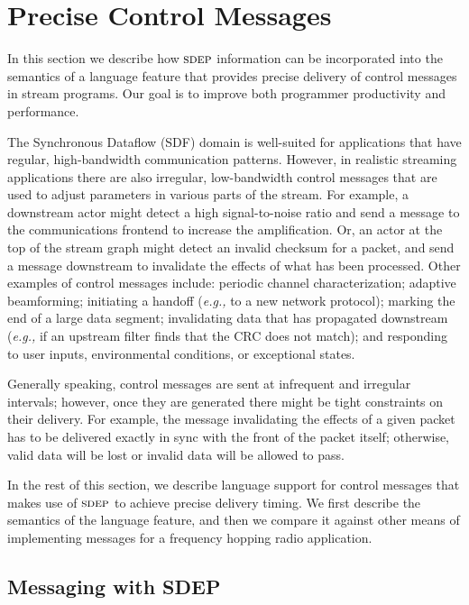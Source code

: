 \section{Precise Control Messages}
In this section we describe how $\textsc{sdep}$ information can be
incorporated into the semantics of a language feature that provides
precise delivery of control messages in stream programs.  Our goal is
to improve both programmer productivity and performance.

The Synchronous Dataflow (SDF) domain is well-suited for applications
that have regular, high-bandwidth communication patterns.  However, in
realistic streaming applications there are also irregular,
low-bandwidth control messages that are used to adjust parameters in
various parts of the stream.  For example, a downstream actor might
detect a high signal-to-noise ratio and send a message to the
communications frontend to increase the amplification.  Or, an actor
at the top of the stream graph might detect an invalid checksum for a
packet, and send a message downstream to invalidate the effects of
what has been processed.  Other examples of control messages include:
periodic channel characterization; adaptive beamforming; initiating a
handoff ({\it e.g.,} to a new network protocol); marking the end of a
large data segment; invalidating data that has propagated downstream
({\it e.g.,} if an upstream filter finds that the CRC does not match);
and responding to user inputs, environmental conditions, or
exceptional states.

Generally speaking, control messages are sent at infrequent and
irregular intervals; however, once they are generated there might be
tight constraints on their delivery.  For example, the message
invalidating the effects of a given packet has to be delivered exactly
in sync with the front of the packet itself; otherwise, valid data
will be lost or invalid data will be allowed to pass.

In the rest of this section, we describe language support for control
messages that makes use of $\textsc{sdep}$ to achieve precise delivery timing.
We first describe the semantics of the language feature, and then we
compare it against other means of implementing messages for a
frequency hopping radio application.

\subsection{Messaging with SDEP}

